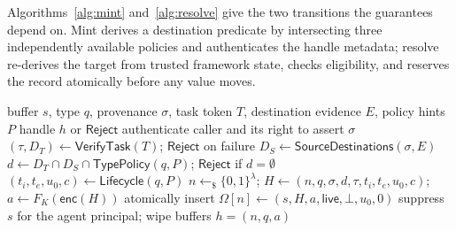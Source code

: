 \documentclass[sigconf,10pt]{acmart}
\newcommand{\SH}{\textsc{SecretHandle}}
\newcommand{\Reject}{\ensuremath{\mathsf{Reject}}}
\newcommand{\enc}{\ensuremath{\mathsf{enc}}}
\theoremstyle{acmplain}%
\begin{document}
Algorithms~\ref{alg:mint} and~\ref{alg:resolve} give the two transitions the guarantees depend on. Mint derives a destination predicate by intersecting three independently available policies and authenticates the handle metadata; resolve re-derives the target from trusted framework state, checks eligibility, and reserves the record atomically before any value moves.

\begin{algorithm}[t]
\caption{\SH{} Mint}
\label{alg:mint}
\begin{algorithmic}[1]
\Require buffer $s$, type $q$, provenance $\sigma$, task token $T$, destination evidence $E$, policy hints $P$
\Ensure handle $h$ or $\Reject$
\State authenticate caller and its right to assert $\sigma$
\State $(\tau,D_T)\gets\mathsf{VerifyTask}(T)$; \Return $\Reject$ on failure
\State $D_S\gets\mathsf{SourceDestinations}(\sigma,E)$
\State $d\gets D_T\cap D_S\cap\mathsf{TypePolicy}(q,P)$; \Return $\Reject$ if $d=\emptyset$
\State $(t_i,t_e,u_0,c)\gets\mathsf{Lifecycle}(q,P)$
\State $n\leftarrow_{\$}\{0,1\}^\lambda$; $H\gets(n,q,\sigma,d,\tau,t_i,t_e,u_0,c)$; $a\gets F_K(\enc(H))$
\State atomically insert $\Omega[n]\gets(s,H,a,\mathsf{live},\bot,u_0,0)$
\State suppress $s$ for the agent principal; wipe buffers
\State \Return $h=(n,q,a)$
\end{algorithmic}
\end{algorithm}
\end{document}

